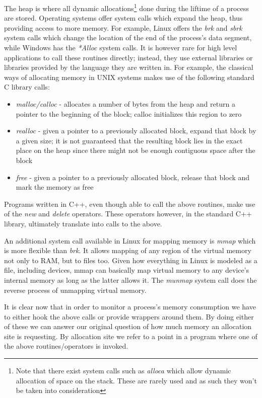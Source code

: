 The heap is where all dynamic allocations\footnote{Note that there exist system calls such as \textit{alloca} which allow dynamic allocation of space on the stack. These are rarely used and as such they won't be taken into consideration} done during the liftime of a process are stored. Operating systems offer system calls which expand the heap, thus providing access to more memory. For example, Linux offers the \textit{brk} and \textit{sbrk} system calls which change the location of the end of the process's data segment, while Windows has the \textit{*Alloc} system calls. It is however rare for high level applications to call these routines directly; instead, they use external libraries or libraries provided by the language they are written in. For example, the classical ways of allocating memory in UNIX systems makes use of the following standard C library calls:

\begin{itemize}
\item \textit{malloc/calloc} - allocates a number of bytes from the heap and return a pointer to the beginning of the block; calloc initializes this region to zero
\item \textit{realloc} - given a pointer to a previously allocated block, expand that block by a given size; it is not guaranteed that the resulting block lies in the exact place on the heap since there might not be enough contiguous space after the block
\item \textit{free} - given a pointer to a previously allocated block, release that block and mark the memory as free
\end{itemize}

Programs written in C++, even though able to call the above routines, make use of the \textit{new} and \textit{delete} operators. These operators however, in the standard C++ library, ultimately translate into calls to the above.

An additional system call available in Linux for mapping memory is \textit{mmap} which is more flexible than \textit{brk}. It allows mapping of any region of the virtual memory not only to RAM, but to files too. Given how everything in Linux is modeled as a file, including devices, mmap can basically map virtual memory to any device's internal memory as long as the latter allows it. The \textit{munmap} system call does the reverse process of unmapping virtual memory.

It is clear now that in order to monitor a process's memory consumption we have to either hook the above calls or provide wrappers around them. By doing either of these we can answer our original question of how much memory an allocation site is requesting. By allocation site we refer to a point in a program where one of the above routines/operators is invoked.

